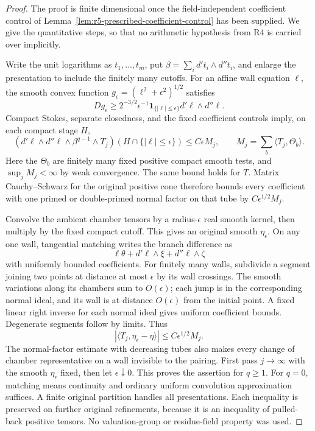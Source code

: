 \documentclass[11pt,a4paper]{article}
\numberwithin{equation}{section}
\theoremstyle{definition}
\theoremstyle{remark}
\begin{document}
\begin{proof}
The proof is finite dimensional once the field-independent
coefficient control of Lemma~\ref{lem:r5-prescribed-coefficient-control}
has been supplied. We give the quantitative steps, so that no
arithmetic hypothesis from R4 is carried over implicitly.

Write the unit logarithms as $t_1,\ldots,t_m$, put
$\beta=\sum_i d't_i\wedge d''t_i$, and enlarge the presentation
to include the finitely many cutoffs. For an affine wall equation
$\ell$, the smooth convex function
$g_\epsilon=(\ell^2+\epsilon^2)^{1/2}$ satisfies
\[
 Dg_\epsilon\geq 2^{-3/2}\epsilon^{-1}
       \mathbf1_{\{|\ell|\leq\epsilon\}}d'\ell\wedge d''\ell.
\]
Compact Stokes, separate closedness, and the fixed coefficient
controls imply, on each compact stage $H$,
\[
 (d'\ell\wedge d''\ell\wedge\beta^{q-1}\wedge T_j)
       (H\cap\{|\ell|\leq\epsilon\})
       \leq C\epsilon M_j,
 \qquad M_j=\sum_b\langle T_j,\Theta_b\rangle.
\]
Here the $\Theta_b$ are finitely many fixed positive compact smooth
tests, and $\sup_jM_j<\infty$ by weak convergence. The same bound
holds for $T$. Matrix Cauchy--Schwarz for the original positive cone
therefore bounds every coefficient with one primed or double-primed
normal factor on that tube by $C\epsilon^{1/2}M_j$.

Convolve the ambient chamber tensors by a radius-$\epsilon$ real
smooth kernel, then multiply by the fixed compact cutoff. This gives
an original smooth $\eta_\epsilon$. On any one wall, tangential
matching writes the branch difference as
\[
 \ell\theta+d'\ell\wedge\xi+d''\ell\wedge\zeta
\]
with uniformly bounded coefficients. For finitely many walls,
subdivide a segment joining two points at distance at most
$\epsilon$ by its wall crossings. The smooth variations along its
chambers sum to $O(\epsilon)$; each jump is in the corresponding
normal ideal, and its wall is at distance $O(\epsilon)$ from the
initial point. A fixed linear right inverse for each normal ideal
gives uniform coefficient bounds. Degenerate segments follow by
limits. Thus
\[
 |\langle T_j,\eta_\epsilon-\eta\rangle|
       \leq C\epsilon^{1/2}M_j.
\]
The normal-factor estimate with decreasing tubes also makes every
change of chamber representative on a wall invisible to the pairing.
First pass $j\to\infty$ with the smooth $\eta_\epsilon$ fixed,
then let $\epsilon\downarrow0$. This proves the assertion for
$q\geq1$. For $q=0$, matching means continuity and ordinary uniform
convolution approximation suffices. A finite original partition
handles all presentations. Each inequality is preserved on further
original refinements, because it is an inequality of pulled-back
positive tensors. No valuation-group or residue-field property was
used.
\end{proof}
\end{document}
